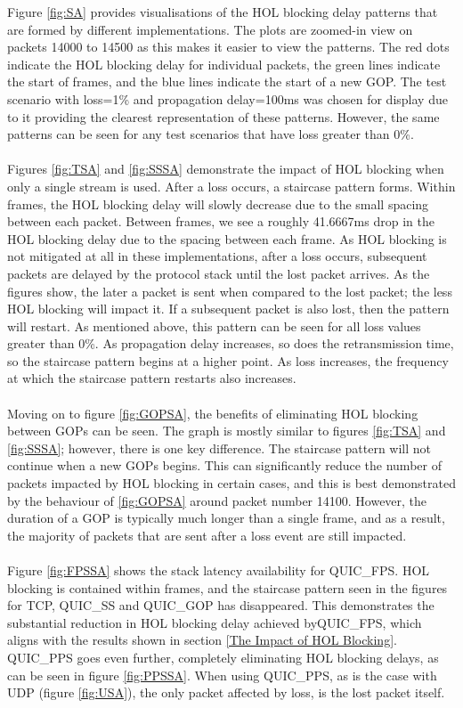 \documentclass{mpaper}
\begin{document}
\noindent Figure \ref{fig:SA} provides visualisations of the HOL blocking delay patterns that are formed by different implementations. The plots are zoomed-in view on packets 14000 to 14500 as this makes it easier to view the patterns. The red dots indicate the HOL blocking delay for individual packets, the green lines indicate the start of frames, and the blue lines indicate the start of a new GOP. The test scenario with loss=1\% and propagation delay=100ms was chosen for display due to it providing the clearest representation of these patterns. However, the same patterns can be seen for any test scenarios that have loss greater than 0\%. 
\\\\
Figures \ref{fig:TSA} and \ref{fig:SSSA} demonstrate the impact of HOL blocking when only a single stream is used. After a loss occurs, a staircase pattern forms. Within frames, the HOL blocking delay will slowly decrease due to the small spacing between each packet. Between frames, we see a roughly 41.6667ms drop in the HOL blocking delay due to the spacing between each frame. As HOL blocking is not mitigated at all in these implementations, after a loss occurs, subsequent packets are delayed by the protocol stack until the lost packet arrives. As the figures show, the later a packet is sent when compared to the lost packet; the less HOL blocking will impact it. If a subsequent packet is also lost, then the pattern will restart. As mentioned above, this pattern can be seen for all loss values greater than 0\%. As propagation delay increases, so does the retransmission time, so the staircase pattern begins at a higher point. As loss increases, the frequency at which the staircase pattern restarts also increases.
\\\\
Moving on to figure \ref{fig:GOPSA}, the benefits of eliminating HOL blocking between GOPs can be seen. The graph is mostly similar to figures \ref{fig:TSA} and \ref{fig:SSSA}; however, there is one key difference. The staircase pattern will not continue when a new GOPs begins. This can significantly reduce the number of packets impacted by HOL blocking in certain cases, and this is best demonstrated by the behaviour of \ref{fig:GOPSA} around packet number 14100. However, the duration of a GOP is typically much longer than a single frame, and as a result, the majority of packets that are sent after a loss event are still impacted.
\\\\
Figure \ref{fig:FPSSA} shows the stack latency availability for QUIC\_FPS. HOL blocking is contained within frames, and the staircase pattern seen in the figures for TCP, QUIC\_SS and QUIC\_GOP has disappeared. This demonstrates the substantial reduction in HOL blocking delay achieved by\newline QUIC\_FPS, which aligns with the results shown in section \ref{The Impact of HOL Blocking}. QUIC\_PPS goes even further, completely eliminating HOL blocking delays, as can be seen in figure \ref{fig:PPSSA}. When using QUIC\_PPS, as is the case with UDP (figure \ref{fig:USA}), the only packet affected by loss, is the lost packet itself.
\end{document}
